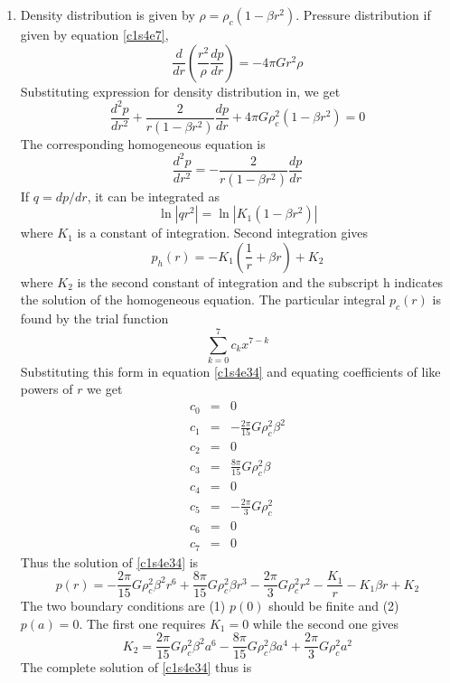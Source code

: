 \begin{enumerate}
\item Density distribution is given by $\rho = \rho_c(1 - \beta r^2)$. Pressure distribution if given by equation \eqref{c1s4e7},
\[
\frac{d}{dr}\left(\frac{r^2}{\rho}\frac{dp}{dr}\right) = -4\pi Gr^2\rho
\]
Substituting expression for density distribution in, we get
\begin{equation}\label{c1s4e34}
\frac{d^2p}{dr^2} + \frac{2}{r(1 - \beta r^2)}\frac{dp}{dr} + 4\pi G\rho_c^2(1 - \beta r^2) = 0
\end{equation}
The corresponding homogeneous equation is
\begin{equation}\label{c1s4e35}
\frac{d^2p}{dr^2} = -\frac{2}{r(1 - \beta r^2)}\frac{dp}{dr}
\end{equation}
If $q=dp/dr$, it can be integrated as
\begin{equation}\label{c1s4e36}
\ln|qr^2| = \ln|K_1(1-\beta r^2)|
\end{equation}
where $K_1$ is a constant of integration. Second integration gives
\begin{equation}\label{c1s4e37}
p_h(r) = -K_1\left(\frac{1}{r} + \beta r\right) + K_2
\end{equation}
where $K_2$ is the second constant of integration and the subscript h indicates the solution of the homogeneous equation. The particular integral $p_c(r)$ is found by the trial function 
\[
\sum_{k=0}^7c_kx^{7-k}
\]
Substituting this form in equation \eqref{c1s4e34} and equating coefficients of like powers of $r$ we get
\begin{eqnarray*}
c_0 &=& 0		\\
c_1 &=& -\frac{2\pi}{15}G\rho_c^2\beta^2	\\
c_2 &=& 0		\\
c_3 &=& \frac{8\pi}{15}G\rho_c^2\beta	\\
c_4 &=& 0		\\
c_5 &=& -\frac{2\pi}{3}G\rho_c^2		\\
c_6 &=& 0		\\
c_7 &=& 0	
\end{eqnarray*}
Thus the solution of \eqref{c1s4e34} is
\[
p(r) = -\frac{2\pi}{15}G\rho_c^2\beta^2r^6 + \frac{8\pi}{15}G\rho_c^2\beta r^3 - \frac{2\pi}{3}G\rho_c^2r^2 - \frac{K_1}{r} - K_1\beta r + K_2
\]
The two boundary conditions are (1) $p(0)$ should be finite and (2) $p(a)=0$. The first one requires $K_1 = 0$ while the second one gives
\[
K_2 = \frac{2\pi}{15}G\rho_c^2\beta^2a^6 - \frac{8\pi}{15}G\rho_c^2\beta a^4 + \frac{2\pi}{3}G\rho_c^2a^2
\]
The complete solution of \eqref{c1s4e34} thus is

\end{enumerate}
